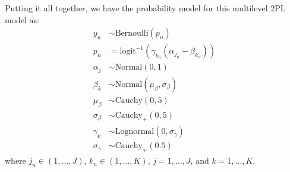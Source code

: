 \documentclass[12pt]{article}
\begin{document}
Putting it all together, we have the probability model for this multilevel 2PL model as:
\begin{align*}
  y_n &\sim \mathrm{Bernoulli}\left(p_n\right) \\
  p_n &= \mathrm{logit}^{-1}\left(\gamma_{k_n}\left(\alpha_{j_n}-\beta_{k_n}\right)\right) \\
  \alpha_j &\sim \mathrm{Normal}\left(0,1 \right)\\
  \beta_k &\sim \mathrm{Normal} \left(\mu_\beta, \sigma_\beta\right)\\
  \mu_\beta &\sim \mathrm{Cauchy} \left(0, 5 \right) \\
  \sigma_\beta &\sim \mathrm{Cauchy}_+ \left(0, 5 \right) \\
  \gamma_k &\sim \mathrm{Lognormal} \left(0, \sigma_\gamma \right) \\
  \sigma_\gamma &\sim \mathrm{Cauchy}_+ \left(0. 5 \right)
\end{align*}
where $j_n \in \left(1,\ldots,J \right)$, $k_n \in \left(1,\ldots,K \right)$, $j=1,\ldots, J$, and $k=1,\ldots,K$.
\end{document}
